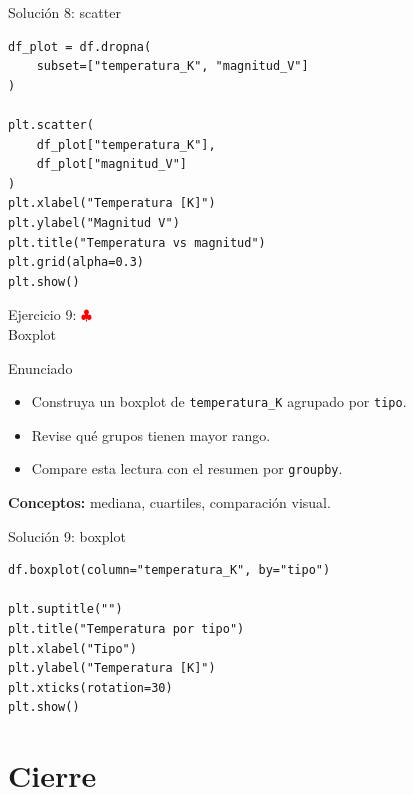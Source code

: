 \documentclass[10pt]{beamer}
\begin{document}
\begin{solutionblock}
\begin{frame}[fragile,shrink=5]{Solución 8: scatter}
\begin{verbatim}
df_plot = df.dropna(
    subset=["temperatura_K", "magnitud_V"]
)

plt.scatter(
    df_plot["temperatura_K"],
    df_plot["magnitud_V"]
)
plt.xlabel("Temperatura [K]")
plt.ylabel("Magnitud V")
plt.title("Temperatura vs magnitud")
plt.grid(alpha=0.3)
plt.show()
\end{verbatim}
\end{frame}
\end{solutionblock}

\begin{frame}{Ejercicio 9: \hfill \textcolor{red}{$\clubsuit$} \\ Boxplot}
  \begin{block}{Enunciado}
    \begin{itemize}
      \item Construya un boxplot de \texttt{temperatura\_K} agrupado por \texttt{tipo}.
      \item Revise qué grupos tienen mayor rango.
      \item Compare esta lectura con el resumen por \texttt{groupby}.
    \end{itemize}
  \end{block}
  \textbf{Conceptos:} mediana, cuartiles, comparación visual.
\end{frame}

\begin{solutionblock}
\begin{frame}[fragile,shrink=5]{Solución 9: boxplot}
\begin{verbatim}
df.boxplot(column="temperatura_K", by="tipo")

plt.suptitle("")
plt.title("Temperatura por tipo")
plt.xlabel("Tipo")
plt.ylabel("Temperatura [K]")
plt.xticks(rotation=30)
plt.show()
\end{verbatim}
\end{frame}
\end{solutionblock}

\section{Cierre}
\end{document}
